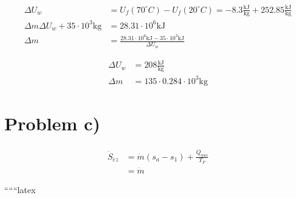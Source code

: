 \begin{align*}
\Delta U_w &= U_f(70^\circ C) - U_f(20^\circ C) = -8.3 \frac{\text{kJ}}{\text{kg}} + 252.85 \frac{\text{kJ}}{\text{kg}} \\
\Delta m \Delta U_w + 35 \cdot 10^3 \text{kg} &= 28.31 \cdot 10^6 \text{kJ} \\
\Delta m &= \frac{28.31 \cdot 10^6 \text{kJ} - 35 \cdot 10^3 \text{kJ}}{\Delta U_w}
\end{align*}

\begin{align*}
\Delta U_w &= 208 \frac{\text{kJ}}{\text{kg}} \\
\Delta m &= 135 \cdot 0.284 \cdot 10^3 \text{kg}
\end{align*}

\section*{Problem c)}

\begin{align*}
\dot{S}_{ez} &= \dot{m} (s_a - s_1) + \frac{\dot{Q}_{aus}}{T_F} \\
&= \dot{m}
\end{align*}

``````latex


